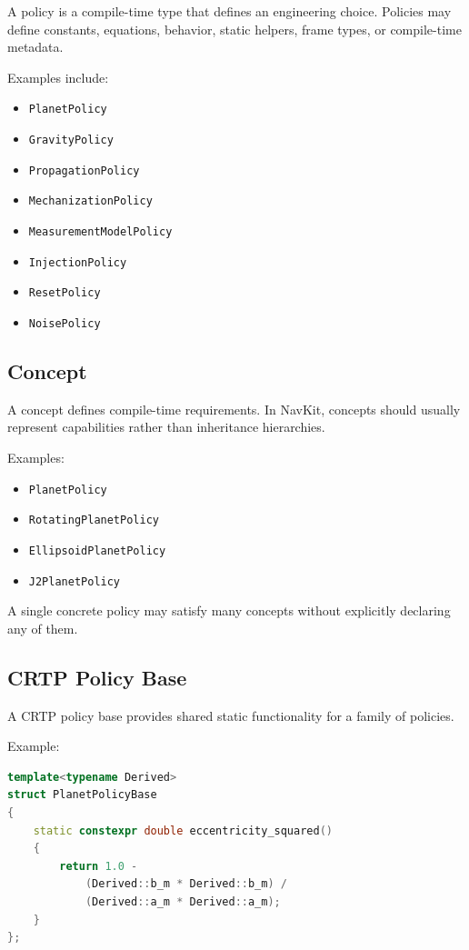 \documentclass[11pt]{article}
\begin{document}
A policy is a compile-time type that defines an engineering choice. Policies
may define constants, equations, behavior, static helpers, frame types, or
compile-time metadata.

Examples include:

\begin{itemize}
    \item \texttt{PlanetPolicy}
    \item \texttt{GravityPolicy}
    \item \texttt{PropagationPolicy}
    \item \texttt{MechanizationPolicy}
    \item \texttt{MeasurementModelPolicy}
    \item \texttt{InjectionPolicy}
    \item \texttt{ResetPolicy}
    \item \texttt{NoisePolicy}
\end{itemize}

\subsection{Concept}

A concept defines compile-time requirements. In NavKit, concepts should usually
represent capabilities rather than inheritance hierarchies.

Examples:

\begin{itemize}
    \item \texttt{PlanetPolicy}
    \item \texttt{RotatingPlanetPolicy}
    \item \texttt{EllipsoidPlanetPolicy}
    \item \texttt{J2PlanetPolicy}
\end{itemize}

A single concrete policy may satisfy many concepts without explicitly declaring
any of them.

\subsection{CRTP Policy Base}

A CRTP policy base provides shared static functionality for a family of
policies.

Example:

\begin{lstlisting}[language=C++]
template<typename Derived>
struct PlanetPolicyBase
{
    static constexpr double eccentricity_squared()
    {
        return 1.0 -
            (Derived::b_m * Derived::b_m) /
            (Derived::a_m * Derived::a_m);
    }
};
\end{lstlisting}
\end{document}
